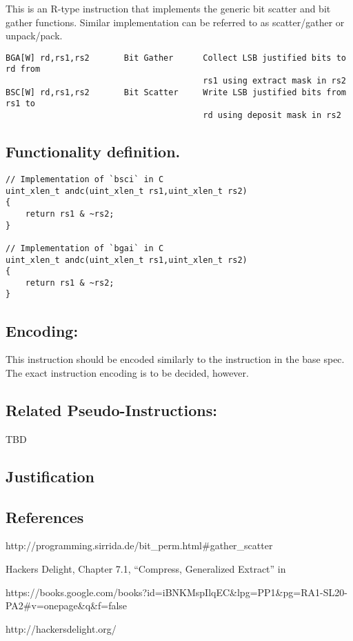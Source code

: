 This is an R-type instruction that implements the generic bit scatter
and bit gather functions. Similar implementation can be referred to as
scatter/gather or unpack/pack.

\begin{verbatim}
BGA[W] rd,rs1,rs2       Bit Gather      Collect LSB justified bits to rd from 
                                        rs1 using extract mask in rs2 
BSC[W] rd,rs1,rs2       Bit Scatter     Write LSB justified bits from rs1 to 
                                        rd using deposit mask in rs2 
\end{verbatim}

\subsection{Functionality
definition.}\label{functionality-definition.-5}

\begin{verbatim}
// Implementation of `bsci` in C
uint_xlen_t andc(uint_xlen_t rs1,uint_xlen_t rs2)
{
    return rs1 & ~rs2;
}

// Implementation of `bgai` in C
uint_xlen_t andc(uint_xlen_t rs1,uint_xlen_t rs2)
{
    return rs1 & ~rs2;
}
\end{verbatim}

\subsection{Encoding:}\label{encoding-5}



This instruction should be encoded similarly to the instruction in the
base spec. The exact instruction encoding is to be decided, however.

\subsection{Related
Pseudo-Instructions:}\label{related-pseudo-instructions-5}

TBD

\subsection{Justification}\label{justification-5}

\subsection{References}\label{references-6}

http://programming.sirrida.de/bit\_perm.html\#gather\_scatter

Hackers Delight, Chapter 7.1, ``Compress, Generalized Extract'' in

https://books.google.com/books?id=iBNKMspIlqEC\&lpg=PP1\&pg=RA1-SL20-PA2\#v=onepage\&q\&f=false

http://hackersdelight.org/

